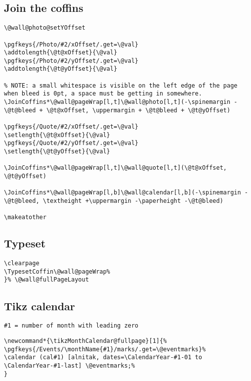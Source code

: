 \documentclass[11pt,oneside]{memoir-article}
\begin{document}
\subsection{Join the coffins}
\label{sec:orgf57fc27}

\begin{verbatim}
\@wall@photo@setYOffset

\pgfkeys{/Photo/#2/xOffset/.get=\@val}
\addtolength{\@t@xOffset}{\@val}
\pgfkeys{/Photo/#2/yOffset/.get=\@val}
\addtolength{\@t@yOffset}{\@val}

% NOTE: a small whitespace is visible on the left edge of the page when bleed is 0pt, a space must be getting in somewhere.
\JoinCoffins*\@wall@pageWrap[l,t]\@wall@photo[l,t](-\spinemargin -\@t@bleed + \@t@xOffset, \uppermargin + \@t@bleed + \@t@yOffset)

\pgfkeys{/Quote/#2/xOffset/.get=\@val}
\setlength{\@t@xOffset}{\@val}
\pgfkeys{/Quote/#2/yOffset/.get=\@val}
\setlength{\@t@yOffset}{\@val}

\JoinCoffins*\@wall@pageWrap[l,t]\@wall@quote[l,t](\@t@xOffset, \@t@yOffset)

\JoinCoffins*\@wall@pageWrap[l,b]\@wall@calendar[l,b](-\spinemargin -\@t@bleed, \textheight +\uppermargin -\paperheight -\@t@bleed)

\makeatother
\end{verbatim}

\subsection{Typeset}
\label{sec:org4335a91}

\begin{verbatim}
\clearpage
\TypesetCoffin\@wall@pageWrap%
}% \@wall@fullPageLayout
\end{verbatim}

\subsection{Tikz calendar}
\label{sec:org66a8015}

\begin{verbatim}
#1 = number of month with leading zero
\end{verbatim}

\begin{verbatim}
\newcommand*{\tikzMonthCalendar@fullpage}[1]{%
\pgfkeys{/Events/\monthName{#1}/marks/.get=\@eventmarks}%
\calendar (cal#1) [alnitak, dates=\CalendarYear-#1-01 to \CalendarYear-#1-last] \@eventmarks;%
}
\end{verbatim}
\end{document}
